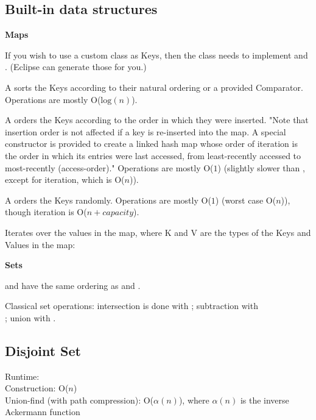 
\subsection*{Built-in data structures}

\textbf{Maps}

If you wish to use a custom class as Keys, then the class needs to implement  and . (Eclipse can generate those for you.)

A  sorts the Keys according to their natural ordering or a provided Comparator. Operations are mostly O($\text{log}(n)$).

A  orders the Keys according to the order in which they were inserted. "Note that insertion order is not affected if a key is re-inserted into the map. A special constructor is provided to create a linked hash map whose order of iteration is the order in which its entries were last accessed, from least-recently accessed to most-recently (access-order)." Operations are mostly O($1$) (slightly slower than , except for iteration, which is O($n$)).

A  orders the Keys randomly. Operations are mostly O($1$) (worst case O($n$)), though iteration is O($n+capacity$).

Iterates over the values in the map, where K and V are the types of the Keys and Values in the map:



\textbf{Sets}

 and  have the same ordering as  and .

Classical set operations: intersection is done with ; subtraction with \\ ; union with  .

\subsection*{Disjoint Set} 

Runtime: \\
\indent Construction: O($n$) \\
\indent Union-find (with path compression): O($\alpha (n)$), where $\alpha (n)$ is the inverse Ackermann function

